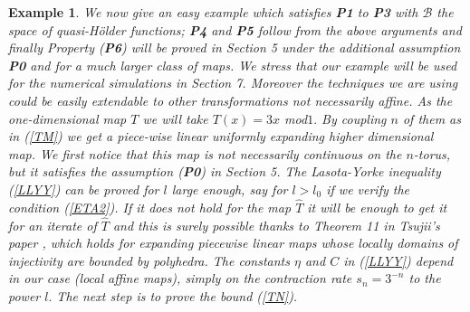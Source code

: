 \documentclass[12pt,reqno,a4paper]{amsart}
\newtheorem{example}[thm]{Example}
\newcommand{\T}{{\mathcal{T}}}
\def\T{\hat{T}}
\begin{document}
\begin{example}\label{EX0}
\em We now give an easy example which satisfies {\bf P1} to {\bf P3} with $\mathcal{B}$ the space of quasi-H\"older functions; {\bf P4} and {\bf P5} follow from the above arguments and finally Property ({\bf P6}) will be proved in Section 5 under the additional assumption {\bf P0} and for a much larger class of maps. We stress that our example will be used for the numerical simulations in Section 7. Moreover the techniques we are using could be easily extendable to other transformations not necessarily affine.   As the one-dimensional map $T$ we will take $T(x)=3x$ mod$1.$ By  coupling $n$ of them  as in  (\ref{TM}) we get a piece-wise linear uniformly expanding higher dimensional map. We first notice that this map is not necessarily continuous on the $n$-torus, but it satisfies
the assumption ({\bf P0}) in Section 5. The Lasota-Yorke inequality (\ref{LLYY}) can be proved for $l$ large enough, say for $l>l_0$ if we verify the condition (\ref{ETA2}). If it does not hold for the map $\hat{T}$ it will be enough to get it for an iterate of $\T$ and this is surely possible thanks to Theorem 11 in Tsujii's paper \cite{TSU}, which holds for expanding piecewise linear maps whose locally domains of injectivity are bounded by polyhedra. The constants $\eta$ and $C$ in (\ref{LLYY}) depend in our case (local affine maps), simply on the contraction rate $s_n=3^{-n}$ to the power $l.$ The next step is to prove the bound (\ref{TN}).


\end{example}
\end{document}
